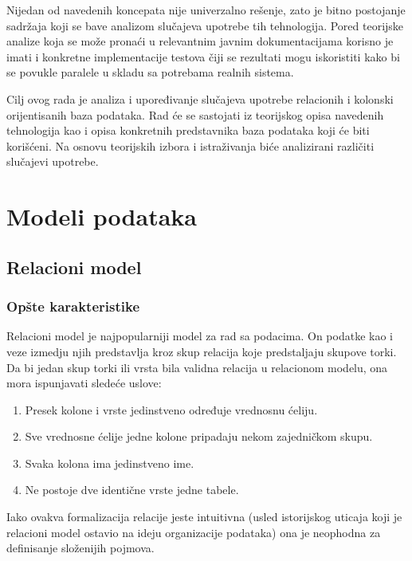 \documentclass[12pt,oneside]{memoir}
\begin{document}
Nijedan od navedenih koncepata nije univerzalno rešenje, zato je bitno postojanje sadržaja koji se bave analizom slučajeva upotrebe tih tehnologija. Pored teorijske analize koja se može pronaći u relevantnim javnim dokumentacijama korisno je imati i konkretne implementacije testova čiji se rezultati mogu iskoristiti kako bi se povukle paralele u skladu sa potrebama realnih  sistema. 

Cilj ovog rada je analiza i upoređivanje slučajeva upotrebe relacionih i kolonski orijentisanih baza podataka. Rad će se sastojati iz teorijskog opisa navedenih tehnologija kao i opisa konkretnih predstavnika baza podataka koji će biti korišćeni. Na osnovu teorijskih izbora i istraživanja biće analizirani različiti slučajevi upotrebe. 


\chapter{Modeli podataka}
\label{chp:razrada}
\section{Relacioni model}
\subsection{Opšte karakteristike}
Relacioni model je najpopularniji model za rad sa podacima. On podatke kao i veze izmedju njih predstavlja kroz skup relacija koje predstaljaju skupove torki. Da bi jedan skup torki ili vrsta bila validna relacija u relacionom modelu, ona mora ispunjavati sledeće uslove:

\begin{enumerate}
\item[\textbullet] Presek kolone i vrste jedinstveno određuje vrednosnu ćeliju.

\item[\textbullet] Sve vrednosne ćelije jedne kolone pripadaju nekom zajedničkom skupu. 

\item[\textbullet] Svaka kolona ima jedinstveno ime.

\item[\textbullet] Ne postoje dve identične vrste jedne tabele. 
\end{enumerate}

Iako ovakva formalizacija relacije jeste intuitivna (usled istorijskog uticaja koji je relacioni model ostavio na ideju organizacije podataka) ona je neophodna za  definisanje složenijih pojmova. 
\end{document}
